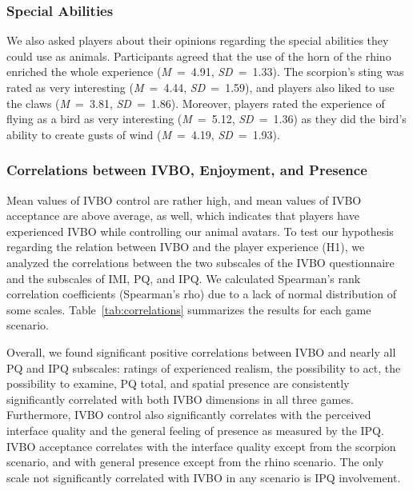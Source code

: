 \documentclass{sigchi}
\begin{document}
 
 \subsubsection{Special Abilities}

We also asked players about their opinions regarding the special abilities they could use as animals. Participants agreed that the use of the horn of the rhino enriched the whole experience (\textit{M}~=~4.91, \textit{SD}~=~1.33). %
The scorpion's sting was rated as very interesting (\textit{M}~=~4.44, \textit{SD}~=~1.59), %
and players also liked to use the claws (\textit{M}~=~3.81, \textit{SD}~=~1.86). %
Moreover, players rated the experience of flying as a bird as very interesting (\textit{M}~=~5.12, \textit{SD}~=~1.36) %
as they did the bird's ability to create gusts of wind (\textit{M}~=~4.19, \textit{SD}~=~1.93). %




\subsubsection{Correlations between IVBO, Enjoyment, and Presence}
Mean values of IVBO control are rather high, and mean values of IVBO acceptance are above average, as well, which indicates that players have experienced IVBO while controlling our animal avatars. 
To test our hypothesis regarding the relation between IVBO and the player experience (H1), we analyzed the correlations between the two subscales of the IVBO questionnaire and the subscales of IMI, PQ, and IPQ.
We calculated Spearman's rank correlation coefficients (Spearman’s rho) due to a lack of normal distribution of some scales. Table~\ref{tab:correlations} summarizes the results for each game scenario. 

Overall, we found significant positive correlations between IVBO and nearly all PQ and IPQ subscales: ratings of experienced realism, the possibility to act, the possibility to examine, PQ total, and spatial presence are consistently significantly correlated with both IVBO dimensions in all three games. 
Furthermore, IVBO control also significantly correlates with the perceived interface quality and the general feeling of presence as measured by the IPQ. IVBO acceptance correlates with the interface quality except from the scorpion scenario, and with general presence except from the rhino scenario. 
The only scale not significantly correlated with IVBO in any scenario is IPQ involvement. 
\end{document}

